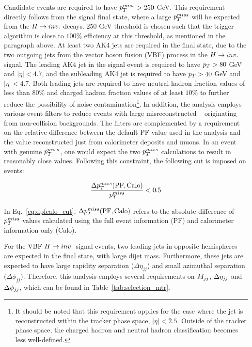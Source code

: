 Candidate events are required to have $p_T^{miss} > 250$ GeV. This requirement directly follows from the signal final state,
where a large $p_T^{miss}$ will be expected from the $H \rightarrow inv.$ decays. $250$ GeV threshold is chosen such that the trigger
algorithm is close to $100\%$ efficiency at this threshold, as mentioned in the paragraph above.
At least two AK4 jets are required in the final state, due to the two outgoing jets from the vector boson fusion (VBF) process
in the $H \rightarrow inv.$ signal.
The leading AK4 jet in the signal event is required to have $p_T > 80$ GeV and $|\eta| < 4.7$, and the subleading AK4 jet is 
required to have $p_T > 40$ GeV and $|\eta| < 4.7$.
Both leading jets are required to have neutral hadron fraction values of less than $80\%$ and charged hadron fraction 
values of at least $10\%$ to further reduce the possibility of noise contamination\footnote{It should be noted that
this requirement applies for the case where the jet is reconstructed within the tracker phase space, $|\eta| < 2.5$.
Outside of the tracker phase space, the charged hadron and neutral hadron classification becomes less well-defined.}. 
In addition, the analysis employs 
various event filters to reduce events with large misreconstructed \ptmiss~\cite{Sirunyan:2019kia} originating from 
non-collision backgrounds. The filters are complemented by a requirement on the relative difference between the default 
PF \ptmiss value used in the analysis and the \ptmiss value reconstructed just from calorimeter deposits and muons. 
In an event with genuine $p_T^{miss}$, one would expect the two $p_T^{miss}$ calculations to result in reasonably close values.
Following this constraint, the following cut is imposed on events:

\begin{equation}
    \frac{\Delta p_T^{miss}(\text{PF},\text{Calo})}{p_T^{miss}} < 0.5
    \label{eq:dpfcalo_cut}
\end{equation}

In Eq.~\ref{eq:dpfcalo_cut}, $\Delta p_T^{miss}(\text{PF},\text{Calo})$ refers to the absolute difference of $p_T^{miss}$ values calculated
using the full event information (PF) and calorimeter information only (Calo).

For the VBF $H \rightarrow inv.$ signal events, two leading jets in opposite hemispheres are expected in the final state, with large dijet mass. 
Furthermore, these jets are expected to have large rapidity separation ($\Delta\eta_{jj}$) and small azimuthal separation ($\Delta\phi_{jj}$). 
Therefore, this analysis employs several requirements on $M_{jj}$, $\Delta \eta_{jj}$ and $\Delta \phi_{jj}$, which can be 
found in Table~\ref{tab:selection_mtr}.

